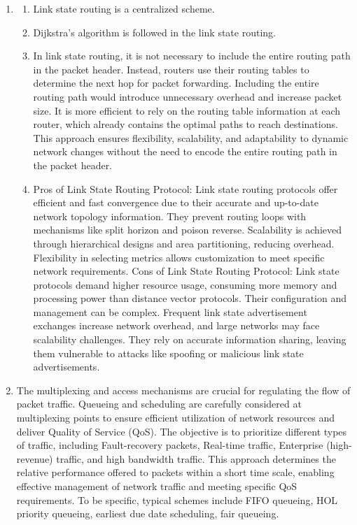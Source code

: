 \documentclass{article}
\begin{document}
\begin{enumerate}
    \item
    \begin{enumerate}
        \item Link state routing is a centralized scheme. 
        \item
        Dijkstra's algorithm is followed in the link state routing.
        \item
        In link state routing, it is not necessary to include the entire routing path in the packet header. Instead, routers use their routing tables to determine the next hop for packet forwarding. Including the entire routing path would introduce unnecessary overhead and increase packet size. It is more efficient to rely on the routing table information at each router, which already contains the optimal paths to reach destinations. This approach ensures flexibility, scalability, and adaptability to dynamic network changes without the need to encode the entire routing path in the packet header.
        \item
        Pros of Link State Routing Protocol:
Link state routing protocols offer efficient and fast convergence due to their accurate and up-to-date network topology information. They prevent routing loops with mechanisms like split horizon and poison reverse. Scalability is achieved through hierarchical designs and area partitioning, reducing overhead. Flexibility in selecting metrics allows customization to meet specific network requirements.
\newline 
Cons of Link State Routing Protocol:
Link state protocols demand higher resource usage, consuming more memory and processing power than distance vector protocols. Their configuration and management can be complex. Frequent link state advertisement exchanges increase network overhead, and large networks may face scalability challenges. They rely on accurate information sharing, leaving them vulnerable to attacks like spoofing or malicious link state advertisements.
        
    \end{enumerate}
    
    \item
    The multiplexing and access mechanisms are crucial for regulating the flow of packet traffic. Queueing and scheduling are carefully considered at multiplexing points to ensure efficient utilization of network resources and deliver Quality of Service (QoS). The objective is to prioritize different types of traffic, including Fault-recovery packets, Real-time traffic, Enterprise (high-revenue) traffic, and high bandwidth traffic. This approach determines the relative performance offered to packets within a short time scale, enabling effective management of network traffic and meeting specific QoS requirements.
    \newline 
    To be specific, typical schemes include FIFO queueing, HOL priority queueing, earliest due date scheduling, fair queueing.
    

\end{enumerate}
\end{document}
